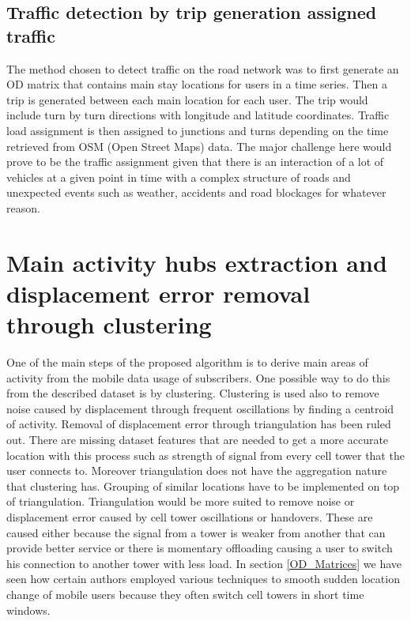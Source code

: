 \documentclass[12pt, a4paper]{report}
\theoremstyle{definition}
\theoremstyle{definition}%
\theoremstyle{definition}%
\theoremstyle{definition}%
\theoremstyle{definition}%
\theoremstyle{definition}%
\begin{document}

\subsection{Traffic detection by trip generation assigned traffic}
The method chosen to detect traffic on the road network was to first generate an OD matrix that contains main stay locations for users in a time series. Then a trip is generated between each main location for each user. The trip would include turn by turn directions with longitude and latitude coordinates. Traffic load assignment is then assigned to junctions and turns depending on the time retrieved from OSM (Open Street Maps) data. The major challenge here would prove to be the traffic assignment given that there is an interaction of a lot of vehicles at a given point in time with a complex structure of roads and unexpected events such as weather, accidents and road blockages for whatever reason. 


\section{Main activity hubs extraction and displacement error removal through clustering}\label{clustering}

One of the main steps of the proposed algorithm is to derive main areas of activity from the mobile data usage of subscribers. One possible way to do this from the described dataset is by clustering. Clustering is used also to remove noise caused by displacement through frequent oscillations by finding a centroid of activity. Removal of displacement error through triangulation has been ruled out. There are missing dataset features that are needed to get a more accurate location with this process such as strength of signal from every cell tower that the user connects to. Moreover triangulation does not have the aggregation nature that clustering has. Grouping of similar locations have to be implemented on top of triangulation. Triangulation would be more suited to remove noise or displacement error caused by cell tower oscillations or handovers. These are caused either because the signal from a tower is weaker from another that can provide better service or there is momentary offloading causing a user to switch his connection to another tower with less load. In section \ref{OD_Matrices} we have seen how certain authors employed various techniques to smooth sudden location change of mobile users because they often switch cell towers in short time windows. 
 
\end{document}
